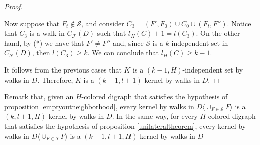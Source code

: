 \documentclass[10pt,a4paper]{article}
\begin{document}
\begin{proof}
\begin{description}
			Now suppose that $F_{t} \notin \mathcal{S}$, and consider $C_{3}=(F', F_{0} ) \cup C_{0} \cup (F_{t}, F'')$. Notice that $C_{3}$ is a walk in $C_{\mathscr{F}}(D)$ such that $l_{H}(C) + 1=l(C_{3})$. On the other hand, by (*) we have that $F' \neq F''$ and, since $\mathcal{S}$ is a $k$-independent set in $C_{\mathscr{F}}(D)$, then $l(C_{3}) \geq k$. We can conclude that $l_{H}(C)\geq k-1$.
\end{description}

It follows from the previous cases that $K$ is a $(k-1,H)$-independent set by walks in $D$. Therefore, $K$ is a $(k-1,l+1)$-kernel by walks in $D$. 
\end{proof}

Remark that, given an $H$-colored digraph that satisfies the hypothesis of proposition \ref{emptyoutneighborhood}, every kernel by walks in $D\langle \cup _{F \in \mathcal{S}} F \rangle $ is a $(k,l+1,H)$-kernel by walks in $D$. In the same way, for every $H$-colored digraph that satisfies the hypothesis of proposition \ref{unilateraltheorem}, every kernel by walks in $D\langle \cup _{F \in \mathcal{S}} F \rangle $ is a $(k-1,l+1,H)$-kernel by walks in $D$
\end{document}
